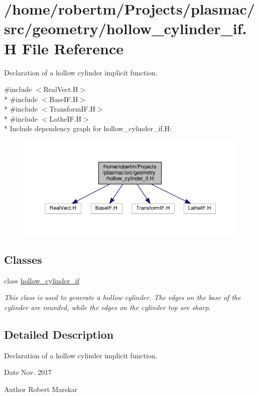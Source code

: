 \hypertarget{hollow__cylinder__if_8H}{}\section{/home/robertm/\+Projects/plasmac/src/geometry/hollow\+\_\+cylinder\+\_\+if.H File Reference}
\label{hollow__cylinder__if_8H}


Declaration of a hollow cylinder implicit function.  


{\ttfamily \#include $<$Real\+Vect.\+H$>$}\\*
{\ttfamily \#include $<$Base\+I\+F.\+H$>$}\\*
{\ttfamily \#include $<$Transform\+I\+F.\+H$>$}\\*
{\ttfamily \#include $<$Lathe\+I\+F.\+H$>$}\\*
Include dependency graph for hollow\+\_\+cylinder\+\_\+if.\+H\+:\nopagebreak
\begin{figure}[H]
\begin{center}
\leavevmode
\includegraphics[width=350pt]{hollow__cylinder__if_8H__incl}
\end{center}
\end{figure}
\subsection*{Classes}
\begin{DoxyCompactItemize}
\item 
class \hyperlink{classhollow__cylinder__if}{hollow\+\_\+cylinder\+\_\+if}
\begin{DoxyCompactList}\small\item\em This class is used to generate a hollow cylinder. The edges on the base of the cylinder are rounded, while the edges on the cylinder top are sharp. \end{DoxyCompactList}\end{DoxyCompactItemize}


\subsection{Detailed Description}
Declaration of a hollow cylinder implicit function. 

\begin{DoxyDate}{Date}
Nov. 2017 
\end{DoxyDate}
\begin{DoxyAuthor}{Author}
Robert Marskar 
\end{DoxyAuthor}
